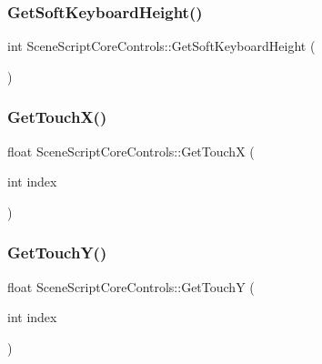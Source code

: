 \hypertarget{class_scene_script_core_controls_ae68999b85e8243ef03e08ed57833aaff}{}\label{class_scene_script_core_controls_ae68999b85e8243ef03e08ed57833aaff} 
\subsubsection{\texorpdfstring{Get\+Soft\+Keyboard\+Height()}{GetSoftKeyboardHeight()}}
{\footnotesize\ttfamily int Scene\+Script\+Core\+Controls\+::\+Get\+Soft\+Keyboard\+Height (\begin{DoxyParamCaption}{ }\end{DoxyParamCaption})}

\hypertarget{class_scene_script_core_controls_a0ac0c40ec17258c84aca35b34b980926}{}\label{class_scene_script_core_controls_a0ac0c40ec17258c84aca35b34b980926} 
\subsubsection{\texorpdfstring{Get\+Touch\+X()}{GetTouchX()}}
{\footnotesize\ttfamily float Scene\+Script\+Core\+Controls\+::\+Get\+TouchX (\begin{DoxyParamCaption}\item[{int}]{index }\end{DoxyParamCaption})}

\hypertarget{class_scene_script_core_controls_a5a5ef38827d98c4939e878fc7f619b46}{}\label{class_scene_script_core_controls_a5a5ef38827d98c4939e878fc7f619b46} 
\subsubsection{\texorpdfstring{Get\+Touch\+Y()}{GetTouchY()}}
{\footnotesize\ttfamily float Scene\+Script\+Core\+Controls\+::\+Get\+TouchY (\begin{DoxyParamCaption}\item[{int}]{index }\end{DoxyParamCaption})}

